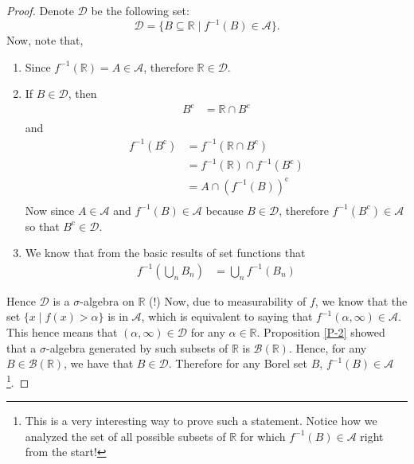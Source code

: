 \documentclass{article}
\theoremstyle{definition}
\theoremstyle{remark}
\theoremstyle{definition}
\theoremstyle{definition}
\theoremstyle{definition}
\newcommand{\intrs}{\cap}
\newcommand{\bunion}{\bigcup}
\newcommand{\where}{\;\vert\;}
\newcommand{\R}{\mathbb{R}}
\newcommand{\alg}[1]{\mathscr{#1}}
\newcommand{\bor}[1]{\mathscr{B}(#1)}
\newcommand{\comp}[1]{#1^{\text{c}}}
\newcommand{\inv}[1]{{#1}^{-1}}
\begin{document}
\begin{proof}
	Denote $ \alg{D} $ be the following set:
	\[\alg{D} = \{B\subseteq \R\where \inv{f}(B) \in \alg{A}\}.\]
	Now, note that,
	\begin{enumerate}
		\item {Since $ \inv{f}(\R) = A \in \alg{A}$, therefore $ \R \in \alg{D} $.}
		\item {If $ B \in \alg{D} $, then 
	\begin{equation*}
		\begin{split}
			\comp{B} &= \R \intrs \comp{B}\\
		\end{split}
	\end{equation*}	
and
\begin{equation*}
	\begin{split}
		\inv{f}(\comp{B}) &= \inv{f}(\R\intrs \comp{B})\\
		&= \inv{f}(\R) \intrs \inv{f}(\comp{B})\\
		&=A\intrs \left (\inv{f}(B)\right )^{\text{c}}\\
	\end{split}
\end{equation*}
Now since $ A \in \alg{A}$ and $ \inv{f}(B) \in \alg{A} $ because $ B\in \alg{D} $, therefore $ \inv{f}(\comp{B})\in \alg{A} $ so that $ \comp{B} \in \alg{D} $.
	}
\item {We know that from the basic results of set functions that
\begin{equation*}
	\begin{split}
		\inv{f}\left (\bunion_n B_n\right ) &= \bunion_n \inv{f}(B_n)
	\end{split}
\end{equation*}
}
	\end{enumerate}
Hence $ \alg{D} $ is a $ \sigma $-algebra on $ \R $ (!) Now, due to measurability of $ f $, we know that the set $ \{x\where f(x)>\alpha\} $ is in $ \alg{A} $, which is equivalent to saying that $ \inv{f}(\alpha,\infty) \in \alg{A}$. This hence means that $ (\alpha,\infty) \in \alg{D} $ for any $ \alpha\in \R $. Proposition \ref{P-2} showed that a $ \sigma$-algebra generated by such subsets of $ \R $ is $ \bor{\R} $. Hence, for any $ B\in \bor{\R} $, we have that $ B\in \alg{D} $. Therefore for any Borel set $ B $, $\inv{f}(B) \in \alg{A}$\footnote{This is a very interesting way to prove such a statement. Notice how we analyzed the set of all possible subsets of $ \R $ for which $ \inv{f}(B) \in \alg{A}$ right from the start!}.
\end{proof}
\hrulefill
\end{document}
